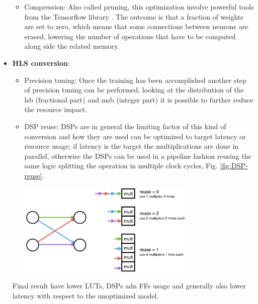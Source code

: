\documentclass[../../main.tex]{subfiles}
\begin{document}
\begin{itemize}
\begin{itemize}
        \item Compression: Also called pruning, this optimization involve powerful tools from the Tensorflow library \cite{tfmot}. The outcome is that a fraction of weights are set to zero, which means that some connections between neurons are erased, lowering the number of operations that have to be computed along side the related memory.  
        
    \end{itemize}
    
    \item \textbf{HLS conversion}: 
    \begin{itemize}
        \item Precision tuning: Once the training has been accomplished another step of precision tuning can be performed, looking at the distribution of the \acrshort{lsb} (fractional part) and \acrshort{msb} (integer part) it is possible to further reduce the resource impact.
        
        \item DSP reuse:  DSPs are in general the limiting factor of this kind of conversion and how they are used can be optimized to target latency or resource usage; if latency is the target the multiplications are done in parallel, otherwise the DSPs can be used in a pipeline fashion reusing the same logic splitting the operation in multiple clock cycles, Fig. \ref{fig:DSP-reuse}.
        
        \begin{minipage}{\linewidth}
            \centering
            \includegraphics[width=8.5cm]{sections/04/Images/reuse_factor.png}
            \label{fig:DSP-reuse}
        \end{minipage}
        
    \end{itemize}
    
     Final result have lower LUTs, DSPs adn FFs usage and generally also lower latency with respect to the unoptimized model.
    
\end{itemize}
    
\end{document}

